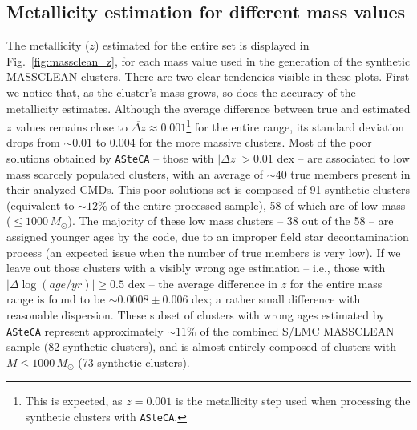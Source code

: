 \documentclass{aa}
\begin{document}
\begin{appendix}

\subsection{Metallicity estimation for different mass values}
\label{apdx:ssec:metallicity}

The metallicity ($z$) estimated for the entire set is displayed in
Fig.~\ref{fig:massclean_z}, for each mass value used in the generation of the
synthetic MASSCLEAN clusters. There are two clear tendencies visible in these
plots.
%
First we notice that, as the cluster's mass grows, so does the accuracy of the
metallicity estimates. Although the average difference between true and
estimated $z$ values remains close to
$\overline{\Delta z}{\approx}0.001$\footnote{This is expected, as $z{=}0.001$
is the metallicity step used when processing the synthetic clusters with
\texttt{ASteCA}.} for the entire range, its standard deviation drops from $
{\sim}0.01$ to $0.004$ for the more massive clusters.
%
%
Most of the poor solutions obtained by \texttt{ASteCA} -- those with
$|\Delta z|{>}0.01$ dex -- are associated to low mass scarcely populated
clusters, with an average of ${{\sim}40}$ true members present in their analyzed
CMDs. This poor solutions set is composed of 91 synthetic clusters
(equivalent to ${\sim}12\%$ of the entire processed sample), 58 of which are
of low mass (${\le}1000\,M_{\odot}$).
%
The majority of these low mass clusters -- 38 out of the 58 -- are assigned
younger ages by the code, due to an improper field star decontamination process 
(an expected issue when the number of true members is very low).
%
If we leave out those clusters with a visibly wrong age estimation -- i.e.,
those with $|\Delta\log(age/yr)|{\ge}0.5$ dex -- the average difference in $z$
for the entire mass range is found to be ${\sim}0.0008{\pm}0.006$ dex; a rather
small difference with reasonable dispersion.
These subset of clusters with wrong ages estimated by \texttt{ASteCA} represent
approximately ${\sim}11\%$ of the combined S/LMC MASSCLEAN sample (82 synthetic
clusters), and is almost entirely composed of clusters with
$M{\le}1000\,M_{\odot}$ (73 synthetic clusters).


\end{appendix}
\end{document}
